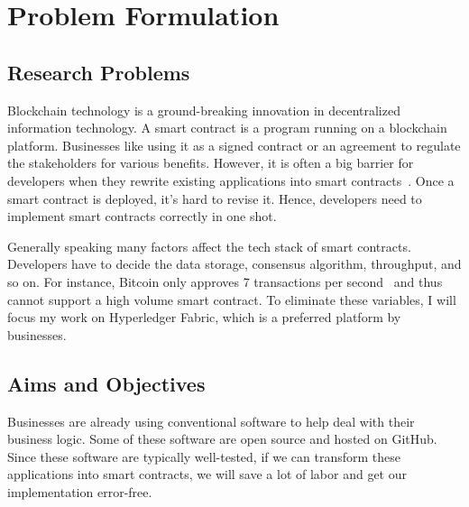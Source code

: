 \chapter{Problem Formulation}

\section{Research Problems}

Blockchain technology is a ground-breaking innovation in decentralized information technology.
A smart contract is a program running on a blockchain platform.
Businesses like using it as a signed contract or an agreement to regulate the stakeholders for various benefits.
However, it is often a big barrier for developers when they rewrite existing applications into smart contracts~\cite{dao2019challenges}.
Once a smart contract is deployed, it's hard to revise it.
Hence, developers need to implement smart contracts correctly in one shot.

Generally speaking many factors affect the tech stack of smart contracts.
Developers have to decide the data storage, consensus algorithm, throughput, and so on.
For instance, Bitcoin only approves 7 transactions per second~\cite{croman2016scaling} and thus cannot support a high volume smart contract.
To eliminate these variables, I will focus my work on Hyperledger Fabric, which is a preferred platform by businesses.








\section{Aims and Objectives}

Businesses are already using conventional software to help deal with their business logic.
Some of these software are open source and hosted on GitHub.
Since these software are typically well-tested, if we can transform these applications into smart contracts, we will save a lot of labor and get our implementation error-free.

